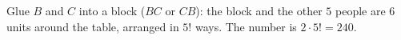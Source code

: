 Glue $B$ and $C$ into a block ($BC$ or $CB$): the block and the other $5$ people are $6$ units around the table, arranged in $5!$ ways. The number is $2\cdot5!=\boxed{240}$.
